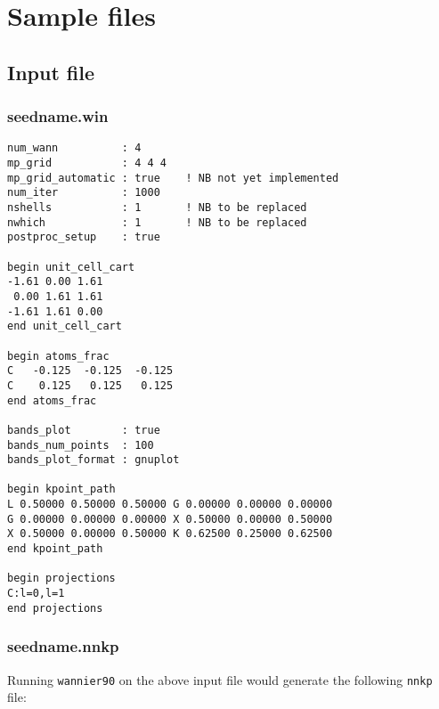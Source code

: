 \chapter{Sample files}

\section{Input file}
\subsection{seedname.win}
\begin{verbatim}
num_wann          : 4 
mp_grid           : 4 4 4
mp_grid_automatic : true    ! NB not yet implemented
num_iter          : 1000
nshells           : 1       ! NB to be replaced
nwhich            : 1       ! NB to be replaced
postproc_setup    : true

begin unit_cell_cart
-1.61 0.00 1.61
 0.00 1.61 1.61
-1.61 1.61 0.00
end unit_cell_cart

begin atoms_frac
C   -0.125  -0.125  -0.125
C    0.125   0.125   0.125
end atoms_frac

bands_plot        : true
bands_num_points  : 100
bands_plot_format : gnuplot

begin kpoint_path
L 0.50000 0.50000 0.50000 G 0.00000 0.00000 0.00000
G 0.00000 0.00000 0.00000 X 0.50000 0.00000 0.50000
X 0.50000 0.00000 0.50000 K 0.62500 0.25000 0.62500
end kpoint_path

begin projections
C:l=0,l=1
end projections
\end{verbatim}

\subsection{seedname.nnkp}
Running \verb#wannier90# on the above input file would generate the
following \verb#nnkp# file: 

